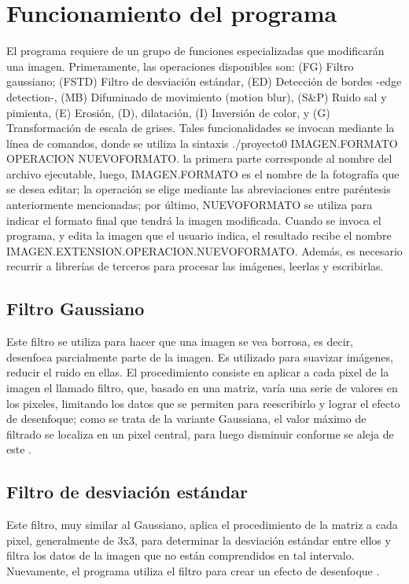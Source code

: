 \section{Funcionamiento del programa}
	El programa requiere de un grupo de funciones especializadas que modificarán una imagen. Primeramente, las operaciones
	disponibles son: (FG) Filtro gaussiano; (FSTD) Filtro de desviación estándar, (ED) Detección de bordes -edge detection-,
	(MB) Difuminado de movimiento (motion blur), (S\&P) Ruido sal y pimienta, (E) Erosión, (D), dilatación, (I) Inversión de
	color, y (G) Transformación de escala de grises. Tales funcionalidades se invocan mediante la línea de comandos, donde 
	se utiliza la sintaxis ./proyecto0 IMAGEN.FORMATO OPERACION NUEVOFORMATO. la primera parte corresponde al nombre del
	archivo ejecutable, luego, IMAGEN.FORMATO es el nombre de la fotografía que se desea editar; la operación se elige 
	mediante las abreviaciones entre paréntesis anteriormente mencionadas; por último, NUEVOFORMATO se utiliza para indicar
	el formato final que tendrá la imagen modificada.
	Cuando se invoca el programa, y edita la imagen que el usuario indica, el resultado recibe el nombre IMAGEN.EXTENSION.OPERACION.NUEVOFORMATO. Además, es necesario recurrir a librerías de terceros para procesar las imágenes, leerlas y escribirlas.



\subsection{Filtro Gaussiano}
	Este filtro se utiliza para hacer que una imagen se vea borrosa, es decir, desenfoca parcialmente parte
	de la imagen. Es utilizado para suavizar imágenes, reducir el ruido en ellas. El procedimiento consiste
	en aplicar a cada pixel de la imagen el llamado filtro, que, basado en una matriz, varía una serie de
	valores en los pixeles, limitando los datos que se permiten para reescribirlo y lograr el efecto de
	desenfoque; como se trata de la variante Gaussiana, el valor máximo de filtrado se localiza en un pixel
	central, para luego disminuir conforme se aleja de este \cite{UMuricia}.
\subsection{Filtro de desviación estándar}
	Este filtro, muy similar al Gaussiano, aplica el procedimiento de la matriz a cada pixel, generalmente de
	3x3, para determinar la desviación estándar entre ellos y filtra los datos de la imagen que no están
	comprendidos en tal intervalo. Nuevamente, el programa utiliza el filtro para crear un efecto de
	desenfoque \cite{Mathworks1}.
	
